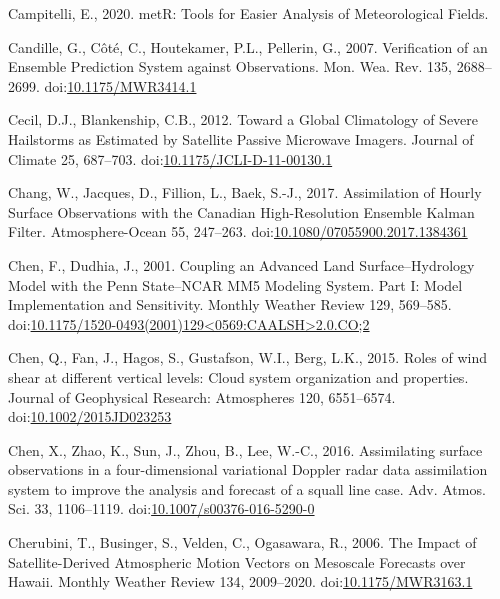 \documentclass[final,5p,times,twocolumn,authoryear]{elsarticle} %
\begin{document}
\leavevmode\hypertarget{ref-campitelli2020}{}%
Campitelli, E., 2020. metR: Tools for Easier Analysis of Meteorological Fields.

\leavevmode\hypertarget{ref-candille2007}{}%
Candille, G., Côté, C., Houtekamer, P.L., Pellerin, G., 2007. Verification of an Ensemble Prediction System against Observations. Mon. Wea. Rev. 135, 2688--2699. doi:\href{https://doi.org/10.1175/MWR3414.1}{10.1175/MWR3414.1}

\leavevmode\hypertarget{ref-cecil2012}{}%
Cecil, D.J., Blankenship, C.B., 2012. Toward a Global Climatology of Severe Hailstorms as Estimated by Satellite Passive Microwave Imagers. Journal of Climate 25, 687--703. doi:\href{https://doi.org/10.1175/JCLI-D-11-00130.1}{10.1175/JCLI-D-11-00130.1}

\leavevmode\hypertarget{ref-chang2017}{}%
Chang, W., Jacques, D., Fillion, L., Baek, S.-J., 2017. Assimilation of Hourly Surface Observations with the Canadian High-Resolution Ensemble Kalman Filter. Atmosphere-Ocean 55, 247--263. doi:\href{https://doi.org/10.1080/07055900.2017.1384361}{10.1080/07055900.2017.1384361}

\leavevmode\hypertarget{ref-chen2001}{}%
Chen, F., Dudhia, J., 2001. Coupling an Advanced Land Surface--Hydrology Model with the Penn State--NCAR MM5 Modeling System. Part I: Model Implementation and Sensitivity. Monthly Weather Review 129, 569--585. doi:\href{https://doi.org/10.1175/1520-0493(2001)129\%3C0569:CAALSH\%3E2.0.CO;2}{10.1175/1520-0493(2001)129\textless0569:CAALSH\textgreater2.0.CO;2}

\leavevmode\hypertarget{ref-chen2015}{}%
Chen, Q., Fan, J., Hagos, S., Gustafson, W.I., Berg, L.K., 2015. Roles of wind shear at different vertical levels: Cloud system organization and properties. Journal of Geophysical Research: Atmospheres 120, 6551--6574. doi:\href{https://doi.org/10.1002/2015JD023253}{10.1002/2015JD023253}

\leavevmode\hypertarget{ref-chen2016}{}%
Chen, X., Zhao, K., Sun, J., Zhou, B., Lee, W.-C., 2016. Assimilating surface observations in a four-dimensional variational Doppler radar data assimilation system to improve the analysis and forecast of a squall line case. Adv. Atmos. Sci. 33, 1106--1119. doi:\href{https://doi.org/10.1007/s00376-016-5290-0}{10.1007/s00376-016-5290-0}

\leavevmode\hypertarget{ref-cherubini2006}{}%
Cherubini, T., Businger, S., Velden, C., Ogasawara, R., 2006. The Impact of Satellite-Derived Atmospheric Motion Vectors on Mesoscale Forecasts over Hawaii. Monthly Weather Review 134, 2009--2020. doi:\href{https://doi.org/10.1175/MWR3163.1}{10.1175/MWR3163.1}
\end{document}
